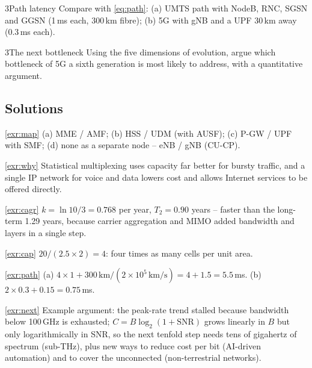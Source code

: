 \documentclass[11pt,a4paper]{article}
\begin{document}
\begin{exercisebox}{3}{Path latency}\label{exr:path}
Compare with \cref{eq:path}: (a) UMTS path with NodeB, RNC, SGSN and GGSN (1\,ms each, 300\,km fibre); (b) 5G with gNB and a UPF 30\,km away (0.3\,ms each).
\end{exercisebox}

\begin{exercisebox}{3}{The next bottleneck}\label{exr:next}
Using the five dimensions of evolution, argue which bottleneck of 5G a sixth generation is most likely to address, with a quantitative argument.
\end{exercisebox}

\subsection*{Solutions}

\begin{solutionbox}{\ref{exr:map}}
(a) MME / AMF; (b) HSS / UDM (with AUSF); (c) P-GW / UPF with SMF; (d) none as a separate node -- eNB / gNB (CU-CP).
\end{solutionbox}

\begin{solutionbox}{\ref{exr:why}}
Statistical multiplexing uses capacity far better for bursty traffic, and a single IP network for voice and data lowers cost and allows Internet services
to be offered directly.
\end{solutionbox}

\begin{solutionbox}{\ref{exr:cagr}}
$k = \ln 10/3 = 0.768$ per year, $T_2 = 0.90$ years -- faster than the long-term 1.29 years, because carrier aggregation and MIMO added bandwidth and layers
in a single step.
\end{solutionbox}

\begin{solutionbox}{\ref{exr:cap}}
$20/(2.5\times2) = 4$: four times as many cells per unit area.
\end{solutionbox}

\begin{solutionbox}{\ref{exr:path}}
(a) $4\times1 + 300\,\text{km}/(2\times10^{5}\,\text{km/s}) = 4 + 1.5 = 5.5$\,ms. (b) $2\times0.3 + 0.15 = 0.75$\,ms.
\end{solutionbox}

\begin{solutionbox}{\ref{exr:next}}
Example argument: the peak-rate trend stalled because bandwidth below 100\,GHz is exhausted; $C = B\log_2(1+\mathrm{SNR})$ grows linearly in $B$ but only
logarithmically in SNR, so the next tenfold step needs tens of gigahertz of spectrum (sub-THz), plus new ways to reduce cost per bit (AI-driven
automation) and to cover the unconnected (non-terrestrial networks).
\end{solutionbox}
\end{document}
